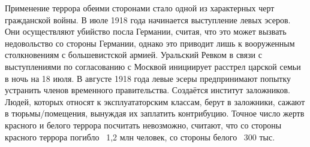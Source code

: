 Применение террора обеими сторонами стало одной из характерных черт гражданской войны.
В июле 1918 года начинается выступление левых эсеров. Они осуществляют убийство посла Германии, считая, что это может вызвать недовольство со стороны Германии, однако это приводит лишь к вооруженным столкновениям с большевистской армией.
Уральский Ревком в связи с выступлениями по согласованию с Москвой инициирует расстрел царской семьи в ночь на 18 июля. 
В августе 1918 года левые эсеры предпринимают попытку устранить членов временного правительства.
Создаётся институт заложников. Людей, которых относят к эксплуататорским классам, берут в заложники, сажают в тюрьмы/помещения, вынуждая их заплатить контрибуцию. 
Точное число жертв красного и белого террора посчитать невозможно, считают, что со стороны красного террора погибло ~1,2 млн человек, со стороны белого ~300 тыс.
